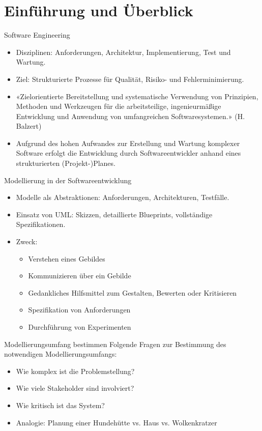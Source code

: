 \section{Einführung und Überblick}

\begin{definition}{Software Engineering}
\begin{itemize}
    \item Disziplinen: Anforderungen, Architektur, Implementierung, Test und Wartung.
    \item Ziel: Strukturierte Prozesse für Qualität, Risiko- und Fehlerminimierung.
    \item «Zielorientierte Bereitstellung und systematische Verwendung von Prinzipien, Methoden und Werkzeugen für die arbeitsteilige, ingenieurmäßige Entwicklung und Anwendung von umfangreichen Softwaresystemen.» (H. Balzert)
    \item Aufgrund des hohen Aufwandes zur Erstellung und Wartung komplexer Software erfolgt die Entwicklung durch Softwareentwickler anhand eines strukturierten (Projekt-)Planes.
\end{itemize}
\end{definition}

\begin{definition}{Modellierung in der Softwareentwicklung}
\begin{itemize}
    \item Modelle als Abstraktionen: Anforderungen, Architekturen, Testfälle.
    \item Einsatz von UML: Skizzen, detaillierte Blueprints, vollständige Spezifikationen.
    \item Zweck:
    \begin{itemize}
        \item Verstehen eines Gebildes
        \item Kommunizieren über ein Gebilde
        \item Gedankliches Hilfsmittel zum Gestalten, Bewerten oder Kritisieren
        \item Spezifikation von Anforderungen
        \item Durchführung von Experimenten
    \end{itemize}
\end{itemize}
\end{definition}

\begin{KR}{Modellierungsumfang bestimmen}
Folgende Fragen zur Bestimmung des notwendigen Modellierungsumfangs:
\begin{itemize}
    \item Wie komplex ist die Problemstellung?
    \item Wie viele Stakeholder sind involviert?
    \item Wie kritisch ist das System?
    \item Analogie: Planung einer Hundehütte vs. Haus vs. Wolkenkratzer
\end{itemize}
\end{KR}

